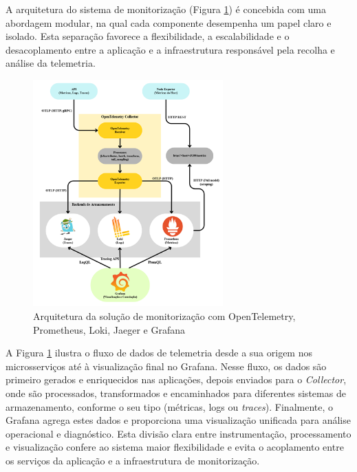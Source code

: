 A arquitetura do sistema de monitorização (Figura \ref{fig:otel_arch}) é concebida com uma abordagem modular, na qual cada componente desempenha um papel claro e isolado. Esta separação favorece a flexibilidade, a escalabilidade e o desacoplamento entre a aplicação e a infraestrutura responsável pela recolha e análise da telemetria.


\begin{figure}[H]
    \centering
    \includegraphics[width=0.65\textwidth]{images/Diagramas/arquitetura_da_solucao.png}
    \caption{Arquitetura da solução de monitorização com OpenTelemetry, Prometheus, Loki, Jaeger e Grafana}
    \label{fig:otel_arch}
\end{figure}

A Figura \ref{fig:otel_arch} ilustra o fluxo de dados de telemetria desde a sua origem nos microsserviços até à visualização final no Grafana. Nesse fluxo, os dados são primeiro gerados e enriquecidos nas aplicações, depois enviados para o \textit{Collector}, onde são processados, transformados e encaminhados para diferentes sistemas de armazenamento, conforme o seu tipo (métricas, logs ou \textit{traces}). Finalmente, o Grafana agrega estes dados e proporciona uma visualização unificada para análise operacional e diagnóstico. Esta divisão clara entre instrumentação, processamento e visualização confere ao sistema maior flexibilidade e evita o acoplamento entre os serviços da aplicação e a infraestrutura de monitorização.

